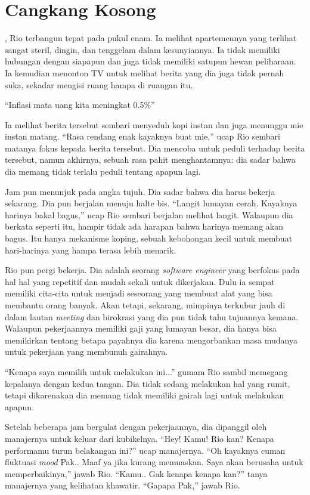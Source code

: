 \chapter*{Cangkang Kosong}

, Rio terbangun tepat pada pukul enam. Ia melihat apartemennya yang terlihat sangat steril, dingin, dan tenggelam dalam kesunyiannya. Ia tidak memiliki hubungan dengan siapapun dan juga tidak memiliki satupun hewan peliharaan. Ia kemudian menonton TV untuk melihat berita yang dia juga tidak pernah suka, sekadar mengisi ruang hampa di ruangan itu.


``Inflasi mata uang kita meningkat 0.5\%''


Ia melihat berita tersebut sembari menyeduh kopi instan dan juga menunggu mie instan matang. ``Rasa rendang enak kayaknya buat mie,'' ucap Rio sembari matanya fokus kepada berita tersebut. Dia mencoba untuk peduli terhadap berita tersebut, namun akhirnya, sebuah rasa pahit menghantamnya: dia sadar bahwa dia memang tidak terlalu peduli tentang apapun lagi.


Jam pun menunjuk pada angka tujuh. Dia sadar bahwa dia harus bekerja sekarang. Dia pun berjalan menuju halte bis. ``Langit lumayan cerah. Kayaknya harinya bakal bagus,'' ucap Rio sembari berjalan melihat langit. Walaupun dia berkata seperti itu, hampir tidak ada harapan bahwa harinya memang akan bagus. Itu hanya mekanisme koping, sebuah kebohongan kecil untuk membuat hari-harinya yang hampa terasa lebih menarik.


Rio pun pergi bekerja. Dia adalah seorang \textit{software engineer} yang berfokus pada hal hal yang repetitif dan mudah sekali untuk dikerjakan. Dulu ia sempat memiliki cita-cita untuk menjadi seseorang yang membuat alat yang bisa membantu orang banyak. Akan tetapi, sekarang, mimpinya terkubur jauh di dalam lautan \textit{meeting} dan birokrasi yang dia pun tidak tahu tujuannya kemana. Walaupun pekerjaannya memiliki gaji yang lumayan besar, dia hanya bisa memikirkan tentang betapa payahnya dia karena mengorbankan masa mudanya untuk pekerjaan yang membunuh gairahnya.


``Kenapa saya memilih untuk melakukan ini...'' gumam Rio sambil memegang kepalanya dengan kedua tangan. Dia tidak sedang melakukan hal yang rumit, tetapi dikarenakan dia memang tidak memiliki gairah lagi untuk melakukan apapun.


Setelah beberapa jam bergulat dengan pekerjaannya, dia dipanggil oleh manajernya untuk keluar dari kubikelnya. ``Hey! Kamu! Rio kan? Kenapa performamu turun belakangan ini?'' ucap manajernya. ``Oh kayaknya cuman fluktuasi \textit{mood} Pak.. Maaf ya jika kurang memuaskan. Saya akan berusaha untuk memperbaikinya,'' jawab Rio. ``Kamu.. Gak kenapa kenapa kan?'' tanya manajernya yang kelihatan khawatir. ``Gapapa Pak,'' jawab Rio.


